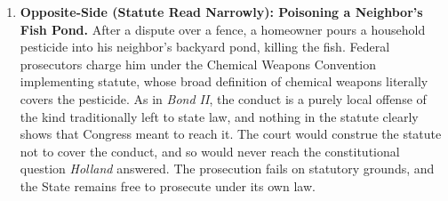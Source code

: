 \documentclass[12pt]{article}
\begin{document}
\begin{enumerate}
\item \textbf{Opposite-Side (Statute Read Narrowly): Poisoning a Neighbor's Fish Pond.} After a dispute over a fence, a homeowner pours a household pesticide into his neighbor's backyard pond, killing the fish. Federal prosecutors charge him under the Chemical Weapons Convention implementing statute, whose broad definition of chemical weapons literally covers the pesticide. As in \textit{Bond II}, the conduct is a purely local offense of the kind traditionally left to state law, and nothing in the statute clearly shows that Congress meant to reach it. The court would construe the statute not to cover the conduct, and so would never reach the constitutional question \textit{Holland} answered. The prosecution fails on statutory grounds, and the State remains free to prosecute under its own law.


\end{enumerate}
\end{document}
